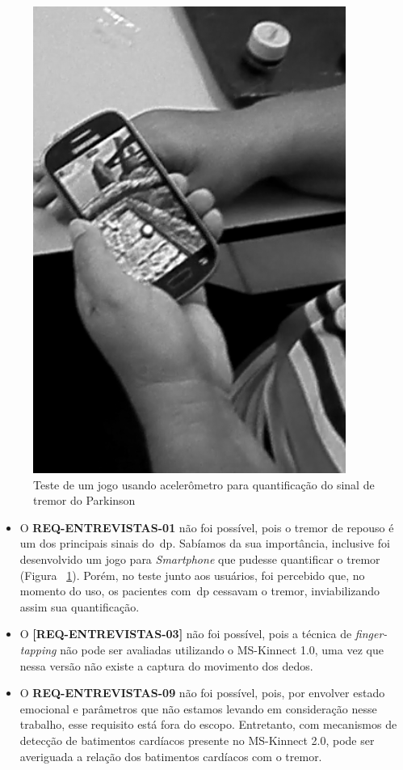 	\begin{figure}[!ht]
	\centering
	\includegraphics[scale=0.5]{./img/gametremor.png}
	\caption{Teste de um jogo usando acelerômetro para quantificação do sinal de tremor do Parkinson}
	\label{fig:gametremor}
	\end{figure}

\begin{itemize}
	\item O \textbf{REQ-ENTREVISTAS-01} não foi possível, pois o tremor de repouso é um dos principais sinais do~\ac{dp}. Sabíamos da sua importância, inclusive foi desenvolvido um jogo para \textit{Smartphone} que pudesse quantificar o tremor (Figura ~\ref{fig:gametremor}). Porém, no teste junto aos usuários, foi percebido que, no momento do uso, os pacientes com~\ac{dp} cessavam o tremor, inviabilizando assim sua quantificação. 
	\item O \textbf{[REQ-ENTREVISTAS-03]} não foi possível, pois a técnica de \textit{finger-tapping} não pode ser avaliadas utilizando o MS-Kinnect 1.0, uma vez que nessa versão não existe a captura do movimento dos dedos.
	\item O \textbf{REQ-ENTREVISTAS-09} não foi possível, pois, por envolver estado emocional e parâmetros que não estamos levando em consideração nesse trabalho, esse requisito está fora do escopo. Entretanto, com mecanismos de detecção de batimentos cardíacos presente no MS-Kinnect 2.0, pode ser averiguada a relação dos batimentos cardíacos com o tremor.
\end{itemize}




